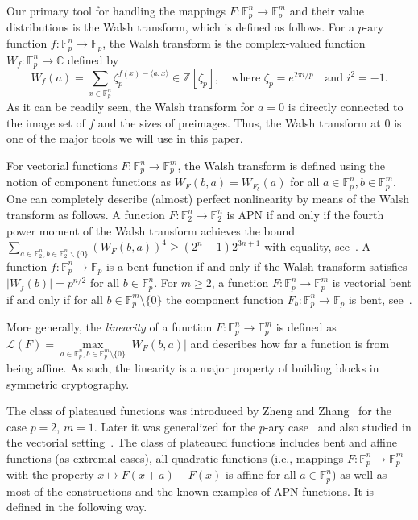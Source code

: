 \documentclass[11pt]{article}
\newcommand{\Z}{\mathbb Z}
\newcommand{\F}{\mathbb F}
\theoremstyle{plain}
\theoremstyle{definition}
\numberwithin{theorem}{section}
\numberwithin{equation}{section}
\numberwithin{table}{section}
\numberwithin{figure}{section}
\begin{document}
{Our primary tool for handling the mappings $F\colon\F_p^n\to\F_p^m$ and their value distributions is the Walsh transform, which is defined as follows. For a $p$-ary function $f\colon\F_p^n\to\F_p$, the Walsh transform is the complex-valued function $W_f\colon\F_{p}^n\to \mathbb{C}$ defined by
$$
W_f(a)=\sum_{x \in \F_p^n} \zeta_p^{f(x) -\langle a, x\rangle} \in \Z[\zeta_p], \quad\mbox{where } \zeta_p=e^{2 \pi i / p} \quad\mbox{and }i^2=-1.
$$
As it can be readily seen, the Walsh transform for $a=0$ is directly connected to the image set of $f$ and the sizes of preimages. Thus, the Walsh transform at $0$ is one of the major tools we will use in this paper.

For vectorial functions $F\colon\F_p^n\to\F_p^m$, the Walsh transform is defined using the notion of component functions as $W_F(b,a)=W_{F_b}(a)$ for all $a\in\F_p^n,b\in\F_p^m$. One can completely describe (almost) perfect nonlinearity by means of the Walsh transform as follows. A function $F\colon\F_2^n\to\F_2^n$ is APN if and only if the fourth power moment of the Walsh transform achieves the bound $\sum_{a \in \F_2^n, b \in \F_2^n \backslash\{0\}}\left(W_F(b,a)\right)^4 \geq\left(2^n-1\right) 2^{3 n+1}$ with equality, see~\cite[Corollary 1]{berger2006almost}. A function $f\colon\F_p^n\to \F_p$ is a bent function if and only if the Walsh transform satisfies $|W_f(b)|=p^{n / 2}$ for all $b \in \F_p^n$. For $m\ge 2$, a function $F\colon\F_p^n\to \F_p^m$ is vectorial bent if and only if for all $b \in \F_p^m\setminus\{0\}$ the component function $F_b\colon\F_p^n\to \F_p$ is bent, see~\cite{MeierStaffelbach89,KaiNy91}.

More generally, the \emph{linearity} of a function $F\colon\F_p^n\to\F_p^m$ is defined as $\mathcal{L}(F)=\max\limits_{a \in \F_p^n, b \in \F_p^m\setminus\{0\}}|W_F(b,a)|$ and describes how far a function is from being  {affine}. As such, the linearity is a major property of building blocks in symmetric cryptography.

The class of plateaued functions was introduced by Zheng and Zhang~\cite{ZhengZhang1999} for the case $p=2$, $m=1$. Later it was generalized for the $p$-ary case~\cite{AycyaWilfried2013} and also studied in the vectorial setting~\cite{carlet2015boolean,Mesnager2018}. The class of plateaued functions includes bent and affine functions (as extremal cases), all quadratic functions (i.e., mappings $F\colon\F_p^n\to\F_p^m$ with the property $x\mapsto F(x+a)-F(x)$ is affine for all $a\in\F_p^n$) as well as most of the constructions and the known examples of APN functions. It is defined in the following way.

}
\end{document}
